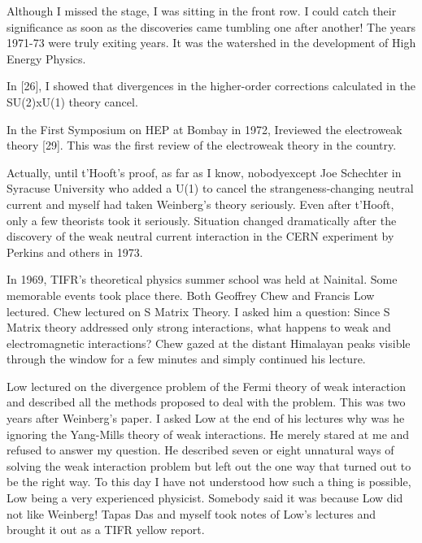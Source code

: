 Although I missed the stage, I was sitting in the front row. I could 
catch their significance as soon as the discoveries came tumbling one 
after another! The years 1971-73 were truly exiting years. It was the 
watershed in the development of High Energy Physics.

In [26], I showed that divergences in the higher-order corrections 
calculated in the SU(2)xU(1) theory cancel.

In the First Symposium on HEP at Bombay in 1972, I\break reviewed the 
electroweak theory [29]. This was the first review of the electroweak 
theory in the country.
 
Actually, until t'Hooft's proof, as far as I know, nobody\break except Joe 
Schechter in Syracuse University who added a U(1) to cancel the 
strangeness-changing neutral current and myself had taken Weinberg's 
theory seriously. Even after t'Hooft, only a few theorists took it 
seriously. Situation changed dramatically after the discovery of the 
weak neutral current interaction in the CERN experiment by Perkins and 
others in 1973.

In 1969, TIFR's theoretical physics summer school was held at Nainital. 
Some memorable events took place there. Both Geoffrey Chew and Francis 
Low lectured. Chew lectured on S Matrix Theory. I asked him a question: 
Since S Matrix theory addressed only strong interactions, what happens 
to weak and electromagnetic interactions? Chew gazed at the distant 
Himalayan peaks visible through the window for a few minutes and simply 
continued his lecture.

Low lectured on the divergence problem of the Fermi theory of weak 
interaction and described all the methods proposed to deal with the 
problem. This was two years after Weinberg's paper. I asked Low at the 
end of his lectures why was he ignoring the Yang-Mills theory of weak 
interactions. He merely stared at me and refused to answer my question. 
He described seven or eight unnatural ways of solving the weak 
interaction problem but left out the one way that turned out to be the 
right way. To this day I have not understood how such a thing is 
possible, Low being a very experienced physicist. Somebody said it was 
because Low did not like Weinberg! Tapas Das and myself took notes of 
Low's lectures and brought it out as a TIFR yellow report.

